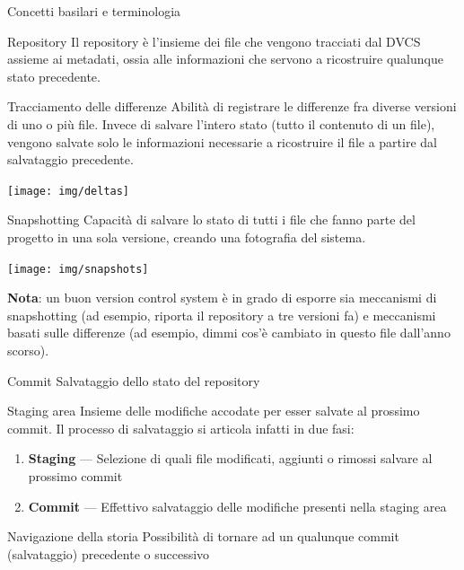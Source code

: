 \documentclass[xcolor=dvipsnames,presentation]{beamer}
\begin{document}
\begin{frame}[allowframebreaks]{Concetti basilari e terminologia}
    \begin{block}{Repository}
        Il repository è l'insieme dei file che vengono tracciati dal DVCS assieme ai metadati, ossia
alle informazioni che servono a ricostruire qualunque stato precedente.
    \end{block}
    \begin{block}{Tracciamento delle differenze}
Abilità di registrare le differenze fra diverse versioni di uno o più file. Invece di
salvare l'intero stato (tutto il contenuto di un file), vengono salvate solo le informazioni
necessarie a ricostruire il file a partire dal salvataggio precedente.
    \end{block}
    \begin{center}
        \texttt{[image: img/deltas]} \\
    \end{center}
    \framebreak
    \begin{block}{Snapshotting}
Capacità di salvare lo stato di tutti i file che fanno parte del progetto in una sola versione, creando una fotografia del sistema.
    \end{block}
    \begin{center}
        \texttt{[image: img/snapshots]} \\
    \end{center}
\textbf{Nota}: un buon version control system è in grado di esporre sia meccanismi di snapshotting (ad esempio, riporta il repository a tre versioni fa)
e meccanismi basati sulle differenze (ad esempio, dimmi cos'è cambiato in questo file dall'anno scorso).
    \framebreak
    \begin{block}{Commit}
        Salvataggio dello stato del repository
    \end{block}
    \begin{block}{Staging area}
        Insieme delle modifiche accodate per esser salvate al prossimo commit. Il processo di
salvataggio si articola infatti in due fasi:
        \begin{enumerate}
            \item \textbf{Staging} --- Selezione di quali file modificati, aggiunti o rimossi
salvare al prossimo commit
            \item \textbf{Commit} --- Effettivo salvataggio delle modifiche presenti nella staging
area
        \end{enumerate}
    \end{block}
    \begin{block}{Navigazione della storia}
        Possibilità di tornare ad un qualunque commit (salvataggio) precedente o successivo
    \end{block}
\end{frame}
\end{document}
